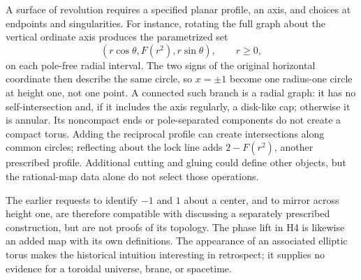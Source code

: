 A surface of revolution requires a specified planar profile, an axis, and choices at endpoints and singularities. For instance, rotating the full graph about the vertical ordinate axis produces the parametrized set
\[
(r\cos\theta,F(r^2),r\sin\theta),\qquad r\ge0,
\]
on each pole-free radial interval. The two signs of the original horizontal coordinate then describe the same circle, so \(x=\pm1\) become one radius-one circle at height one, not one point. A connected such branch is a radial graph: it has no self-intersection and, if it includes the axis regularly, a disk-like cap; otherwise it is annular. Its noncompact ends or pole-separated components do not create a compact torus. Adding the reciprocal profile can create intersections along common circles; reflecting about the lock line adds \(2-F(r^2)\), another prescribed profile. Additional cutting and gluing could define other objects, but the rational-map data alone do not select those operations.

The earlier requests to identify \(-1\) and \(1\) about a center, and to mirror across height one, are therefore compatible with discussing a separately prescribed construction, but are not proofs of its topology. The phase lift in H4 is likewise an added map with its own definitions. The appearance of an associated elliptic torus makes the historical intuition interesting in retrospect; it supplies no evidence for a toroidal universe, brane, or spacetime.
